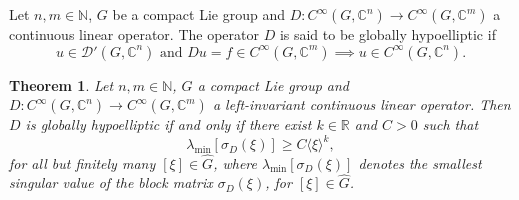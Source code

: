 \documentclass[11pt]{amsart}
\newtheorem{theorem}{Theorem}
\numberwithin{theorem}{section}
\numberwithin{equation}{section}
\theoremstyle{definition}
\numberwithin{example}{section}
\theoremstyle{definition}
\theoremstyle{definition}
\newcommand{\R}{\mathbb{R}}
\newcommand{\N}{\mathbb{N}}
\newcommand{\C}{\mathbb{C}}
\begin{document}
Let $n,m\in\N$, $G$ be a compact Lie group and $D:C^\infty(G,\C^n)\to C^\infty(G,\C^m)$ a continuous linear operator. The operator $D$ is said to be globally hypoelliptic if
$$u\in\mathcal{D}'(G,\C^n)\text{ and } Du=f\in C^\infty(G,\C^m)\implies u\in C^\infty(G,\C^n).$$


\begin{theorem}\label{theo-vector}
    Let $n,m\in\N$, $G$ a compact Lie group and $D:C^\infty(G,\mathbb{C}^n)\to C^\infty(G,\mathbb{C}^m)$ a left-invariant continuous linear operator. Then $D$ is globally hypoelliptic if and only if there exist $k\in\R$ and $C>0$ such that
    \begin{equation}\label{ineq_theo}
        \lambda_{\min}[\sigma_D(\xi)]\geq C\langle\xi\rangle^k,
    \end{equation}
    for all but finitely many $[\xi]\in\widehat{G}$, where $\lambda_{\min}[\sigma_D(\xi)]$ denotes the smallest singular value of the block matrix $\sigma_D(\xi)$, for $[\xi]\in\widehat{G}$.
\end{theorem}
\end{document}
